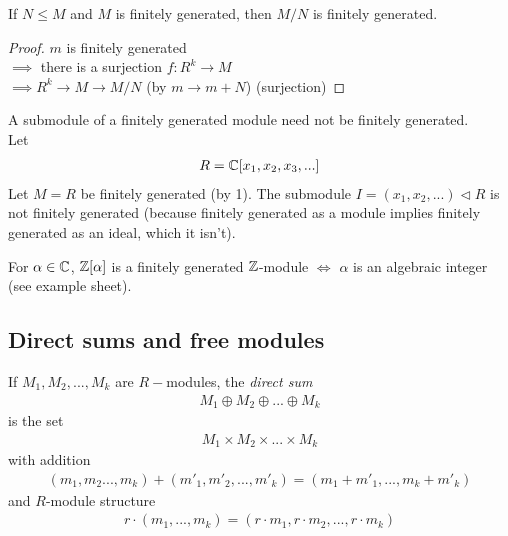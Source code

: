 \documentclass[a4paper]{article}
\begin{document}
\begin{coro}
If $N\leq M$ and $M$ is finitely generated, then $M/N$ is finitely generated.
\begin{proof}
$m$ is finitely generated\\
$\implies$ there is a surjection  $f:R^k \to M$\\
$\implies R^k \to M \to M/N$ (by $m\to m+N$) (surjection)
\end{proof}
\end{coro}

\begin{eg}
A submodule of a finitely generated module need not be finitely generated.\\
Let
\begin{equation*}
\begin{aligned}
R = \mathbb{C}[x_1,x_2,x_3,...]
\end{aligned}
\end{equation*}
Let $M=R$ be finitely generated (by 1). The submodule $I=\left(x_1,x_2,...\right)\triangleleft R$ is not finitely generated (because finitely generated as a module implies finitely generated as an ideal, which it isn't).
\end{eg}

\begin{eg}
For $\alpha\in \mathbb{C}$, $\mathbb{Z}[\alpha]$ is a finitely generated $\mathbb{Z}$-module $\iff$ $\alpha$ is an algebraic integer (see example sheet).
\end{eg}

\subsection{Direct sums and free modules}
\begin{defi}
If $M_1,M_2,...,M_k$ are $R-$modules, the \emph{direct sum}
\begin{equation*}
\begin{aligned}
M_1 \oplus M_2 \oplus ... \oplus M_k
\end{aligned}
\end{equation*}
is the set
\begin{equation*}
\begin{aligned}
M_1 \times M_2 \times ... \times M_k
\end{aligned}
\end{equation*}
with addition
\begin{equation*}
\begin{aligned}
\left(m_1,m_2...,m_k\right) + \left(m'_1,m'_2,...,m'_k\right) = \left(m_1+m'_1,...,m_k+m'_k\right)
\end{aligned}
\end{equation*}
and $R$-module structure
\begin{equation*}
\begin{aligned}
r\cdot \left(m_1,...,m_k\right) = \left(r\cdot m_1,r\cdot m_2,...,r\cdot m_k\right)
\end{aligned}
\end{equation*}
\end{defi}
\end{document}
